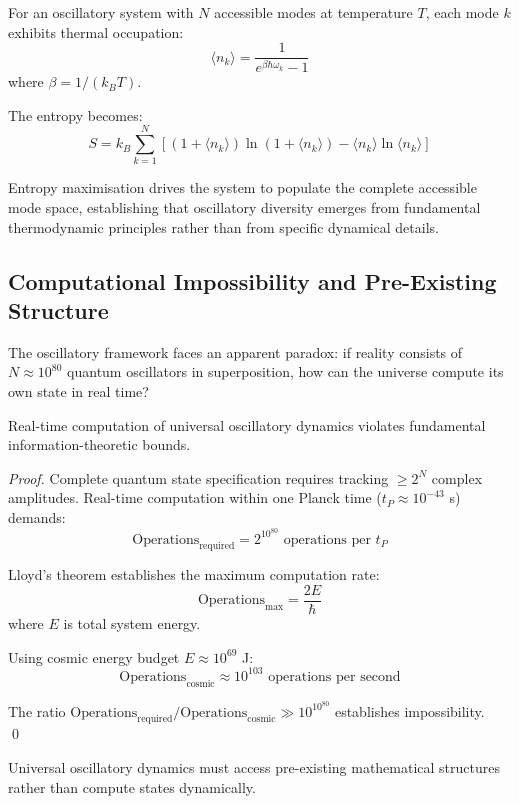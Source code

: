 For an oscillatory system with $N$ accessible modes at temperature $T$, each mode $k$ exhibits thermal occupation:
$$\langle n_k\rangle = \frac{1}{e^{\beta\hbar\omega_k} - 1}$$
where $\beta = 1/(k_B T)$.

The entropy becomes:
$$S = k_B \sum_{k=1}^{N} \left[(1 + \langle n_k\rangle)\ln(1 + \langle n_k\rangle) - \langle n_k\rangle\ln\langle n_k\rangle\right]$$

Entropy maximisation drives the system to populate the complete accessible mode space, establishing that oscillatory diversity emerges from fundamental thermodynamic principles rather than from specific dynamical details.

\subsection{Computational Impossibility and Pre-Existing Structure}

The oscillatory framework faces an apparent paradox: if reality consists of $N \approx 10^{80}$ quantum oscillators in superposition, how can the universe compute its own state in real time?

\begin{theorem}
Real-time computation of universal oscillatory dynamics violates fundamental information-theoretic bounds.
\end{theorem}

\begin{proof}
Complete quantum state specification requires tracking $\geq 2^N$ complex amplitudes. Real-time computation within one Planck time ($t_P \approx 10^{-43}$ s) demands:
$$\text{Operations}_{\text{required}} = 2^{10^{80}} \text{ operations per } t_P$$

Lloyd's theorem establishes the maximum computation rate:
$$\text{Operations}_{\text{max}} = \frac{2E}{\hbar}$$
where $E$ is total system energy.

Using cosmic energy budget $E \approx 10^{69}$ J:
$$\text{Operations}_{\text{cosmic}} \approx 10^{103} \text{ operations per second}$$

The ratio $\text{Operations}_{\text{required}}/\text{Operations}_{\text{cosmic}} \gg 10^{10^{80}}$ establishes impossibility. \qed
\end{proof}

\begin{corollary}
Universal oscillatory dynamics must access pre-existing mathematical structures rather than compute states dynamically.
\end{corollary}
